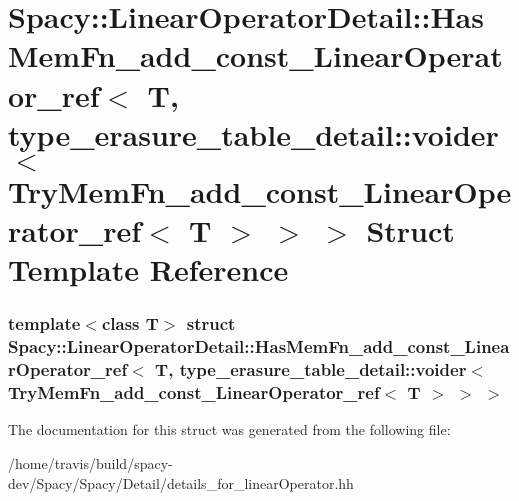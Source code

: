 \hypertarget{structSpacy_1_1LinearOperatorDetail_1_1HasMemFn__add__const__LinearOperator__ref_3_01T_00_01type13193fac66e21feeecdf96ad39eb7239}{\section{\-Spacy\-:\-:\-Linear\-Operator\-Detail\-:\-:\-Has\-Mem\-Fn\-\_\-add\-\_\-const\-\_\-\-Linear\-Operator\-\_\-ref$<$ \-T, type\-\_\-erasure\-\_\-table\-\_\-detail\-:\-:voider$<$ \-Try\-Mem\-Fn\-\_\-add\-\_\-const\-\_\-\-Linear\-Operator\-\_\-ref$<$ \-T $>$ $>$ $>$ \-Struct \-Template \-Reference}
\label{structSpacy_1_1LinearOperatorDetail_1_1HasMemFn__add__const__LinearOperator__ref_3_01T_00_01type13193fac66e21feeecdf96ad39eb7239}
}
\subsubsection*{template$<$class T$>$ struct Spacy\-::\-Linear\-Operator\-Detail\-::\-Has\-Mem\-Fn\-\_\-add\-\_\-const\-\_\-\-Linear\-Operator\-\_\-ref$<$ T, type\-\_\-erasure\-\_\-table\-\_\-detail\-::voider$<$ Try\-Mem\-Fn\-\_\-add\-\_\-const\-\_\-\-Linear\-Operator\-\_\-ref$<$ T $>$ $>$ $>$}



\-The documentation for this struct was generated from the following file\-:\begin{DoxyCompactItemize}
\item 
/home/travis/build/spacy-\/dev/\-Spacy/\-Spacy/\-Detail/details\-\_\-for\-\_\-linear\-Operator.\-hh\end{DoxyCompactItemize}
